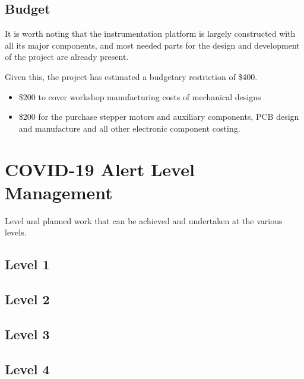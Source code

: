 \documentclass[11pt, a4paper, twoside, openright]{report}
\begin{document}
\subsection{Budget}
It is worth noting that the instrumentation platform is largely constructed with all its major components, and most needed parts for the design and development of the project are already present.

Given this, the project has estimated a budgetary restriction of \$400.
\begin{itemize}
  \item \$200 to cover workshop manufacturing costs of mechanical designs
  \item \$200 for the purchase stepper motors and auxiliary components, PCB design and manufacture and all other electronic component costing. 
\end{itemize}

\section{COVID-19 Alert Level Management}
Level and planned work that can be achieved and undertaken at the various levels.
\subsection{Level 1}
\subsection{Level 2}
\subsection{Level 3}
\subsection{Level 4}


\backmatter

\nocite{*}


\end{document}
